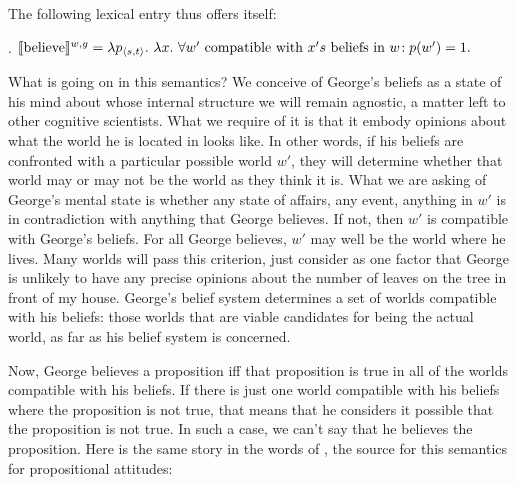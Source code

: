 The following lexical entry thus offers itself:

\ex. $\sv{\mbox{believe}}^{w,g} =\\
\null\hfill\lambda p_{\angles{s,t}}.\ \lambda x. \ \forall w' \mbox{ compatible with } x's \mbox{ beliefs in } w\!: p(w') = 1.$

What %
%
is going on in this semantics? We conceive of George's beliefs as a
state of his mind about whose internal structure we will remain
agnostic, a matter left to other cognitive scientists. What we require
of it is that it embody opinions about what the world he is located in
looks like. In other words, if his beliefs are confronted with a
particular possible world $w'$, they will determine whether that world
may or may not be the world as they think it is. What we are asking of
George's mental state is whether any state of affairs, any event,
anything in $w'$ is in contradiction with anything that George
believes. If not, then $w'$ is compatible with George's beliefs. For
all George believes, $w'$ may well be the world where he lives. Many
worlds will pass this criterion, just consider as one factor that
George is unlikely to have any precise opinions about the number of
leaves on the tree in front of my house. George's belief system
determines a set of worlds compatible with his beliefs: those worlds
that are viable candidates for being the actual world, as far as his
belief system is concerned.

Now, George believes a proposition iff that proposition is true in all
of the worlds compatible with his beliefs. If there is just one world
compatible with his beliefs where the proposition is not true, that
means that he considers it possible that the proposition is not true.
In such a case, we can't say that he believes the proposition. Here is
the same story in the words of \citet{hintikka:1969:attitudes}, the
source for this semantics for propositional attitudes:


